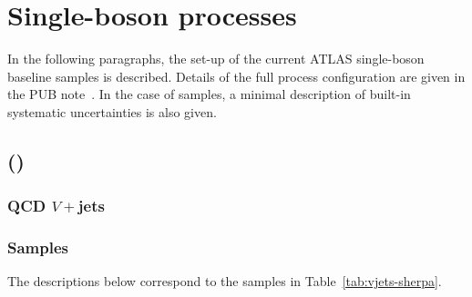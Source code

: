 \section{Single-boson processes}

In the following paragraphs, the set-up of the current ATLAS single-boson baseline samples is described. 
Details of the full process configuration are given in the PUB note~\cite{ATL-PHYS-PUB-2017-006}. In the case of \SHERPA samples,
a minimal description of built-in systematic uncertainties is also given.  


\subsection[Sherpa MEPS@NLO]{\SHERPA (\MEPSatNLO)}

\subsubsection{QCD $V+$jets}

\subsubsection*{Samples}

The descriptions below correspond to the samples in Table~\ref{tab:vjets-sherpa}.

